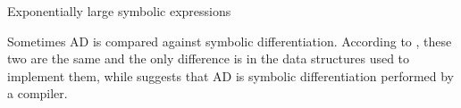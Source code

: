 Exponentially large symbolic expressions \cite{Baydin_Pearlmutter_Radul_Siskind_2015}

Sometimes AD is compared against symbolic differentiation.
According to \cite{Laue2020}, these two are the same and the only difference is in the data structures used to implement them, while \cite{Elliott_2018} suggests that AD is symbolic differentiation performed by a compiler.
